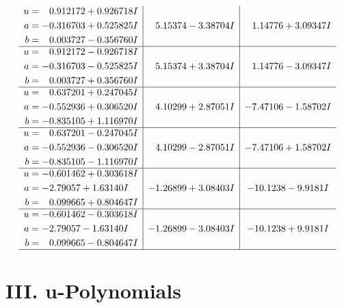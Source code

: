 \documentclass[1p]{elsarticle_modified}
\theoremstyle{definition}
\begin{document}
$$\begin{array}{c|c|c}
\begin{aligned}
u &= \phantom{-}0.912172 + 0.926718 I \\
a &= -0.316703 + 0.525825 I \\
b &= \phantom{-}0.003727 - 0.356760 I\end{aligned}
 & \phantom{-}5.15374 - 3.38704 I & \phantom{-}1.14776 + 3.09347 I \\ \hline\begin{aligned}
u &= \phantom{-}0.912172 - 0.926718 I \\
a &= -0.316703 - 0.525825 I \\
b &= \phantom{-}0.003727 + 0.356760 I\end{aligned}
 & \phantom{-}5.15374 + 3.38704 I & \phantom{-}1.14776 - 3.09347 I \\ \hline\begin{aligned}
u &= \phantom{-}0.637201 + 0.247045 I \\
a &= -0.552936 + 0.306520 I \\
b &= -0.835105 + 1.116970 I\end{aligned}
 & \phantom{-}4.10299 + 2.87051 I & -7.47106 - 1.58702 I \\ \hline\begin{aligned}
u &= \phantom{-}0.637201 - 0.247045 I \\
a &= -0.552936 - 0.306520 I \\
b &= -0.835105 - 1.116970 I\end{aligned}
 & \phantom{-}4.10299 - 2.87051 I & -7.47106 + 1.58702 I \\ \hline\begin{aligned}
u &= -0.601462 + 0.303618 I \\
a &= -2.79057 + 1.63140 I \\
b &= \phantom{-}0.099665 + 0.804647 I\end{aligned}
 & -1.26899 + 3.08403 I & -10.1238 - 9.9181 I \\ \hline\begin{aligned}
u &= -0.601462 - 0.303618 I \\
a &= -2.79057 - 1.63140 I \\
b &= \phantom{-}0.099665 - 0.804647 I\end{aligned}
 & -1.26899 - 3.08403 I & -10.1238 + 9.9181 I\\
 \hline 
 \end{array}$$\newpage
\newpage\renewcommand{\arraystretch}{1}
\centering \section*{ III. u-Polynomials}
\end{document}
